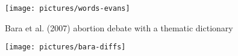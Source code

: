 \documentclass[kp]{foilpack}
\begin{document}
\centerline{\texttt{[image: pictures/words-evans]}}
%
%
%
%
%
%
%
%
%
%
%
%
%
%


Bara et al. (2007) abortion debate with a thematic dictionary
\begin{center}
\texttt{[image: pictures/bara-diffs]}
\end{center}

\end{document}
